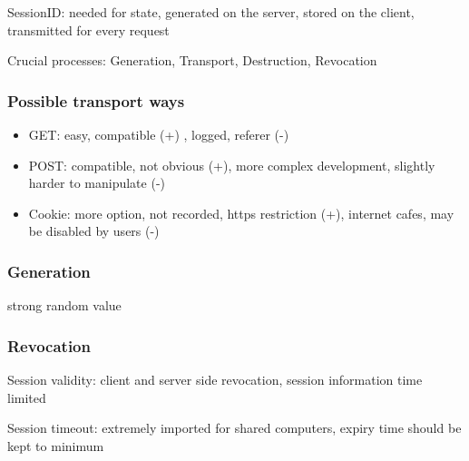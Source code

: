 \documentclass[english, leagacyboxes, nologo]{latex4ei/latex4ei_sheet}
\begin{document}
{  SessionID: needed for state, generated on the server, stored on the client, transmitted for every request

  Crucial processes: Generation, Transport, Destruction, Revocation

  \subsubsection{Possible transport ways}
  \begin{itemize}
  \item GET: easy, compatible (+) , logged, referer (-)
  \item POST: compatible, not obvious (+), more complex development, slightly harder to manipulate (-)
  \item Cookie: more option, not recorded, https restriction (+), internet cafes, may be disabled by users (-)
  \end{itemize}

  \subsubsection{Generation} strong random value

  \subsubsection{Revocation}
  Session validity: client and server side revocation, session information time limited

  Session timeout: extremely imported for shared computers, expiry time should be kept to minimum
  } 

\end{document}
